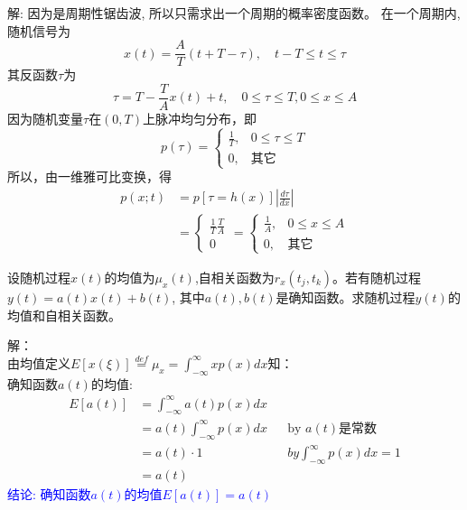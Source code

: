 \begin{frame}
解: 因为是周期性锯齿波, 所以只需求出一个周期的概率密度函数。
在一个周期内,随机信号为
\[x(t)=\frac{A}{T}(t+T-\tau),\quad t-T\le t\le\tau \]
其反函数$\tau$为
\[\tau=T-\frac{T}{A}x(t)+t,\quad 0\le\tau\le T,0\le x\le A \]
因为随机变量$\tau$在$(0,T)$上脉冲均匀分布，即
\[
p(\tau)=\begin{cases}
\frac{1}{T},&0\le\tau\le T\\
0,&\text{其它}
\end{cases} 
\]
所以，由一维雅可比变换，得
\begin{align*}
p(x;t)&=p[\tau=h(x)]\left|\frac{d\tau}{dx}\right|\\
&=\begin{cases}
\frac{1}{T}\frac{T}{A}\\
0
\end{cases}
=\begin{cases}
\frac{1}{A}, &0\le x\le A\\
0,&\text{其它}
\end{cases}
\end{align*}
\end{frame}

\begin{frame}
\begin{example}
设随机过程$x(t)$的均值为$\mu_x(t)$,自相关函数为$r_x(t_j,t_k)$。若有随机过程$y(t)=a(t)x(t)+b(t)$, 其中$a(t),b(t)$是确知函数。求随机过程$y(t)$的均值和自相关函数。
\end{example}
\end{frame}

\begin{frame}
解：\\
由均值定义$E[x(\xi)]\mathop{=}\limits^{def}\mu_x=\int_{-\infty}^{\infty}xp(x)dx$知：\\
确知函数$a(t)$的均值:
\begin{align*}
E[a(t)]&=\int_{-\infty}^{\infty}a(t)p(x)dx\\
&=a(t)\int_{-\infty}^{\infty}p(x)dx &&\text{by $a(t)$是常数}\\
&=a(t)\cdot 1 &&by \int_{-\infty}^{\infty}p(x)dx=1\\
&=a(t)
\end{align*}
\textcolor{blue}{结论: 确知函数$a(t)$的均值$E[a(t)]=a(t)$}
\end{frame}

